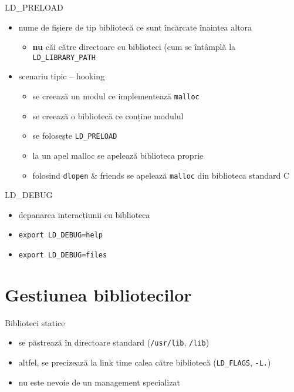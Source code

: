 \documentclass{simple}
\begin{document}
\begin{frame}{LD\_PRELOAD}
  \begin{itemize}
    \item nume de fișiere de tip bibliotecă ce sunt încărcate înaintea altora
      \begin{itemize}
        \item \textbf{nu} căi către directoare cu biblioteci (cum se întâmplă
        la \texttt{LD\_LIBRARY\_PATH}
      \end{itemize}
    \item scenariu tipic -- hooking
      \begin{itemize}
        \item se creează un modul ce implementează \texttt{malloc}
        \item se creează o bibliotecă ce conține modulul
        \item se folosește \texttt{LD\_PRELOAD}
        \item la un apel malloc se apelează biblioteca proprie
        \item folosind \texttt{dlopen} \& friends se apelează \texttt{malloc}
        din biblioteca standard C
      \end{itemize}
  \end{itemize}
\end{frame}

\begin{frame}{LD\_DEBUG}
  \begin{itemize}
    \item depanarea interacțiunii cu biblioteca
    \item \texttt{export LD\_DEBUG=help}
    \item \texttt{export LD\_DEBUG=files}
  \end{itemize}
\end{frame}

\section{Gestiunea bibliotecilor}

\begin{frame}{Biblioteci statice}
  \begin{itemize}
    \item se păstrează în directoare standard (\texttt{/usr/lib},
    \texttt{/lib})
    \item altfel, se precizează la link time calea către bibliotecă
    (\texttt{LD\_FLAGS}, \texttt{-L.})
    \item nu este nevoie de un management specializat
  \end{itemize}
\end{frame}
\end{document}
